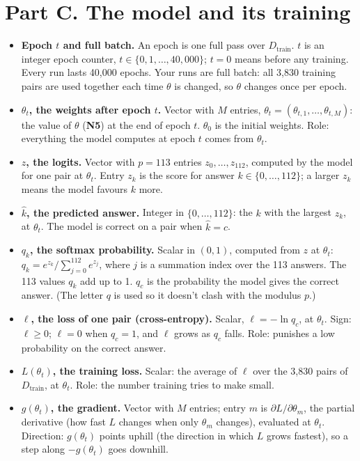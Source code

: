 \documentclass[11pt,a4paper,oneside,openany]{report}
\newcommand{\Dtrain}{D_{\mathrm{train}}}
\newcommand{\gl}[1]{\textbf{#1}}   %
\newenvironment{glist}{\begin{itemize}\setlength{\itemsep}{2pt}\setlength{\parskip}{1pt}}{\end{itemize}}
\begin{document}
\section*{Part C. The model and its training}

\begin{glist}
\item[\gl{N9}] \textbf{Epoch $t$ and full batch.} An epoch is one full pass over $\Dtrain$. $t$ is an integer epoch counter, $t \in \{0, 1, \ldots, 40{,}000\}$; $t = 0$ means before any training. Every run lasts 40{,}000 epochs. Your runs are full batch: all 3{,}830 training pairs are used together each time $\theta$ is changed, so $\theta$ changes once per epoch.
\item[\gl{N10}] \textbf{$\theta_t$, the weights after epoch $t$.} Vector with $M$ entries, $\theta_t = (\theta_{t,1}, \ldots, \theta_{t,M})$: the value of $\theta$ (\gl{N5}) at the end of epoch $t$. $\theta_0$ is the initial weights. Role: everything the model computes at epoch $t$ comes from $\theta_t$.
\item[\gl{N11}] \textbf{$z$, the logits.} Vector with $p = 113$ entries $z_0, \ldots, z_{112}$, computed by the model for one pair at $\theta_t$. Entry $z_k$ is the score for answer $k \in \{0, \ldots, 112\}$; a larger $z_k$ means the model favours $k$ more.
\item[\gl{N12}] \textbf{$\hat k$, the predicted answer.} Integer in $\{0, \ldots, 112\}$: the $k$ with the largest $z_k$, at $\theta_t$. The model is correct on a pair when $\hat k = c$.
\item[\gl{N13}] \textbf{$q_k$, the softmax probability.} Scalar in $(0, 1)$, computed from $z$ at $\theta_t$:
$q_k = e^{z_k} / \sum_{j=0}^{112} e^{z_j}$, where $j$ is a summation index over the 113 answers. The 113 values $q_k$ add up to 1. $q_c$ is the probability the model gives the correct answer. (The letter $q$ is used so it doesn't clash with the modulus $p$.)
\item[\gl{N14}] \textbf{$\ell$, the loss of one pair (cross-entropy).} Scalar, $\ell = -\ln q_c$, at $\theta_t$. Sign: $\ell \ge 0$; $\ell = 0$ when $q_c = 1$, and $\ell$ grows as $q_c$ falls. Role: punishes a low probability on the correct answer.
\item[\gl{N15}] \textbf{$L(\theta_t)$, the training loss.} Scalar: the average of $\ell$ over the 3{,}830 pairs of $\Dtrain$, at $\theta_t$. Role: the number training tries to make small.
\item[\gl{N16}] \textbf{$g(\theta_t)$, the gradient.} Vector with $M$ entries; entry $m$ is $\partial L / \partial \theta_m$, the partial derivative (how fast $L$ changes when only $\theta_m$ changes), evaluated at $\theta_t$. Direction: $g(\theta_t)$ points uphill (the direction in which $L$ grows fastest), so a step along $-g(\theta_t)$ goes downhill.

\end{glist}
\end{document}
